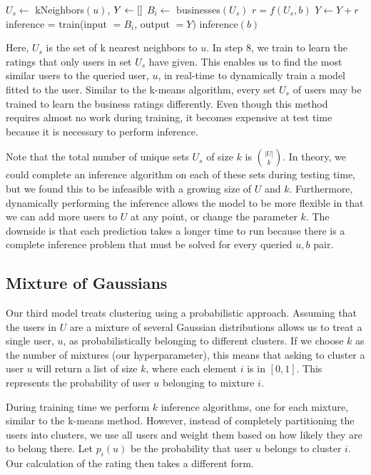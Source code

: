 \documentclass[11pt]{article}
\begin{document}
\begin{algorithmic}[1]
	\State $U_s \gets$ kNeighbors$(u)$, $Y \gets \small[ \small]$
	\State $B_i \gets$ businesses$(U_s)$ 
	\State $r = f(U_s, b)$ 
	\State $Y \gets Y + r$
	\EndFor
	\State inference = train(input $=B_i$, output $=Y)$ 
	\State \Return inference$(b)$
	\EndFunction
\end{algorithmic}
\medskip

Here, $U_s$ is the set of k nearest neighbors to $u$. In step 8, we train to learn the ratings that only users in set $U_s$ have given. This enables us to find the most similar users to the queried user, $u$, in real-time to dynamically train a model fitted to the user. Similar to the k-means algorithm, every set $U_s$ of users may be trained to learn the business ratings differently. Even though this method requires almost no work during training, it becomes expensive at test time because it is necessary to perform inference.

Note that the total number of unique sets $U_s$ of size $k$ is $|U| \choose k$. In theory, we could complete an inference algorithm on each of these sets during testing time, but we found this to be infeasible with a growing size of $U$ and $k$. Furthermore, dynamically performing the inference allows the model to be more flexible in that we can add more users to $U$ at any point, or change the parameter $k$. The downside is that each prediction takes a longer time to run because there is a complete inference problem that must be solved for every queried $u, b$ pair. 

\subsection{Mixture of Gaussians}
Our third model treats clustering using a probabilistic approach. Assuming that the users in $U$ are a mixture of several Gaussian distributions allows us to treat a single user, $u$, as probabilistically belonging to different clusters. If we choose $k$ as the number of mixtures (our hyperparameter), this means that asking to cluster a user $u$ will return a list of size $k$, where each element $i$ is in $[0, 1]$. This represents the probability of user $u$ belonging to mixture $i$.

During training time we perform $k$ inference algorithms, one for each mixture, similar to the k-means method. However, instead of completely partitioning the users into clusters, we use all users and weight them based on how likely they are to belong there. Let $p_i(u)$ be the probability that user $u$ belongs to cluster $i$. Our calculation of the rating then takes a different form.
\end{document}
